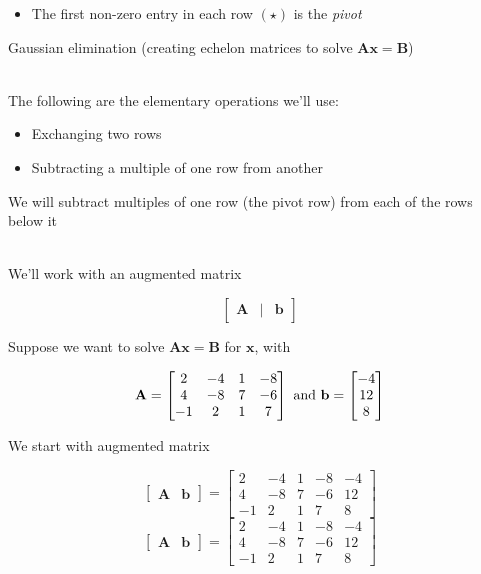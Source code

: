 \documentclass[10pt]{seminar}
\begin{document}
\begin{slide}
\begin{itemize}
$$\begin{bmatrix}
\star &\cdot& \cdot& \cdot \\
 0 &\star &\cdot& \cdot\\
 0& 0& 0& \star \\
 0&0&0&0
\end{bmatrix}
$$
\item The first non-zero entry in each row $(\star)$ is the \textit{pivot}
\end{itemize}

\newslide
Gaussian elimination (creating echelon matrices to solve $\mathbf{Ax=B}$)

\ \\The following are the elementary operations we'll use:
\begin{itemize}
\item Exchanging two rows
\item Subtracting a multiple of one row from another

\end{itemize}

We will subtract multiples of one row (the pivot row) from each of the rows below it

\ \\We'll work with an augmented matrix

$$\begin{bmatrix}\mathbf{A}&|&\mathbf{b}\end{bmatrix}$$

\newslide

Suppose we want to solve  $\mathbf{Ax=B}$  for $\mathbf{x}$, with

$$\mathbf{A}=\begin{bmatrix}
2& -4& 1& -8\\
4& -8& 7& -6\\
-1& 2& 1& 7
\end{bmatrix}
\hbox{ and }
\mathbf{b}=
\begin{bmatrix}
-4\\
12\\
8
\end{bmatrix}$$

We start with augmented matrix

$$\begin{bmatrix}\mathbf{A}&\mathbf{b}\end{bmatrix}=
\begin{bmatrix}
2& -4& 1& -8&-4\\
4& -8& 7& -6&12\\
-1& 2& 1& 7&8
\end{bmatrix}
$$
\newslide
$$\begin{bmatrix}\mathbf{A}&\mathbf{b}\end{bmatrix}=
\begin{bmatrix}
2& -4& 1& -8&-4\\
4& -8& 7& -6&12\\
-1& 2& 1& 7&8
\end{bmatrix}
$$


\end{slide}
\end{document}
